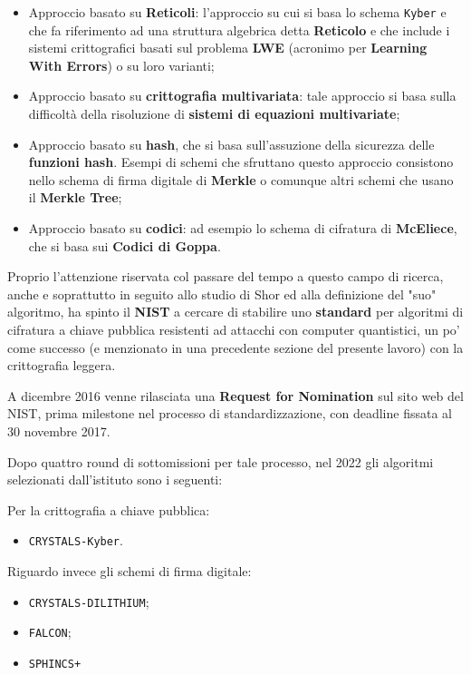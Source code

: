\documentclass[a4paper, 12pt, oneside]{article}
\theoremstyle{definition}
\begin{document}
\begin{itemize}
    \item Approccio basato su \textbf{Reticoli}: l'approccio su cui si basa lo schema \texttt{Kyber} e che fa riferimento ad una struttura algebrica detta \textbf{Reticolo} e che include i sistemi crittografici basati sul problema \textbf{LWE} (acronimo per \textbf{Learning With Errors}) o su loro varianti;
    \item Approccio basato su \textbf{crittografia multivariata}: tale approccio si basa sulla difficoltà della risoluzione di \textbf{sistemi di equazioni multivariate};
    \item Approccio basato su \textbf{hash}, che si basa sull'assuzione della sicurezza delle \textbf{funzioni hash}. Esempi di schemi che sfruttano questo approccio consistono nello schema di firma digitale di \textbf{Merkle} o comunque altri schemi che usano il \textbf{Merkle Tree};
    \item Approccio basato su \textbf{codici}: ad esempio lo schema di cifratura di \textbf{McEliece}, che si basa sui \textbf{Codici di Goppa}.
\end{itemize}

Proprio l'attenzione riservata col passare del tempo a questo campo di ricerca, anche e soprattutto in seguito allo studio di Shor ed alla definizione del "suo" algoritmo, ha spinto il \textbf{NIST} a cercare di stabilire uno \textbf{standard} per algoritmi di cifratura a chiave pubblica resistenti ad attacchi con computer quantistici, un po' come successo (e menzionato in una precedente sezione del presente lavoro) con la crittografia leggera. 

A dicembre 2016 \cite{nist-pqc-nomination} venne rilasciata una \textbf{Request for Nomination} sul sito web del NIST, prima milestone nel processo di standardizzazione, con deadline fissata al 30 novembre 2017. 

Dopo quattro round di sottomissioni per tale processo, nel 2022 gli algoritmi selezionati dall'istituto sono i seguenti:

Per la crittografia a chiave pubblica:

\begin{itemize}
    \item \texttt{CRYSTALS-Kyber}.
\end{itemize}

Riguardo invece gli schemi di firma digitale:

\begin{itemize}
    \item \texttt{CRYSTALS-DILITHIUM};
    \item \texttt{FALCON};
    \item \texttt{SPHINCS+}
\end{itemize}
\end{document}
